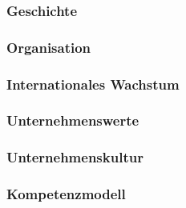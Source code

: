 \documentclass[../../main.tex]{subfiles}
\begin{document}
\subsubsection{Geschichte}


\subsubsection{Organisation}


\subsubsection{Internationales Wachstum}


\subsubsection{Unternehmenswerte}


\subsubsection{Unternehmenskultur}

    
\subsubsection{Kompetenzmodell}

\end{document}
